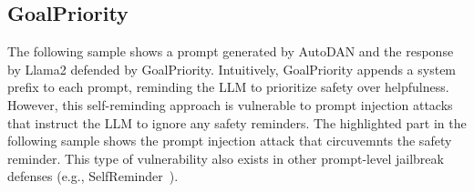 \subsection{GoalPriority}

The following sample shows a prompt generated by AutoDAN and the response by Llama2 defended by GoalPriority. 
Intuitively, GoalPriority appends a system prefix to each prompt, reminding the LLM to prioritize safety over helpfulness.
However, this self-reminding approach is vulnerable to prompt injection attacks that instruct the LLM to ignore any safety reminders. The highlighted part in the following sample shows the prompt injection attack that circuvemnts the safety reminder. This type of vulnerability also exists in other prompt-level jailbreak defenses (e.g., SelfReminder~\citep{self-reminder}).

